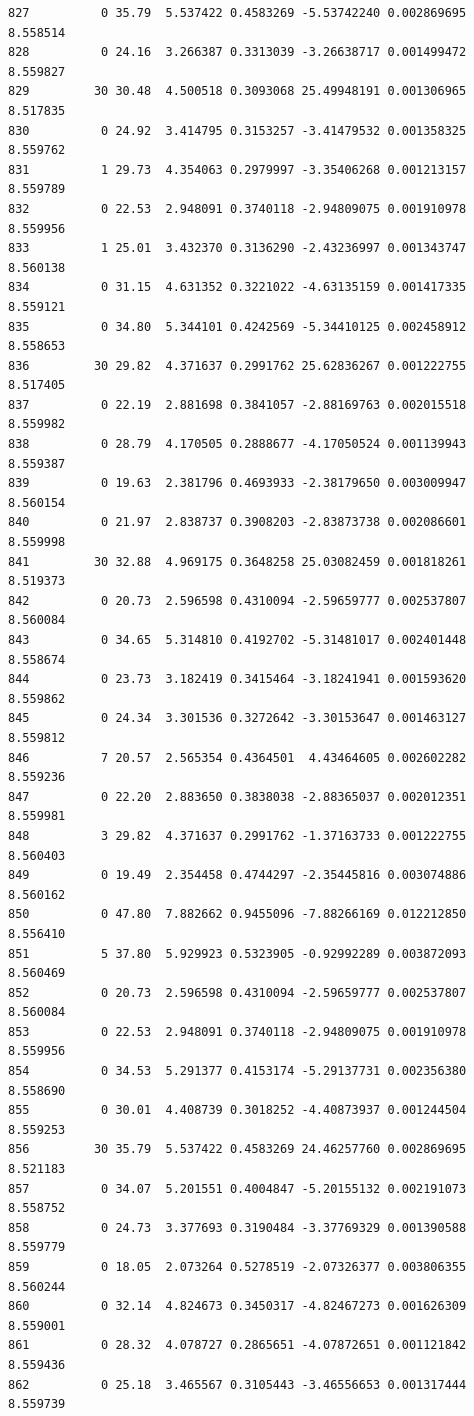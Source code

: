 \documentclass[]{book}
\theoremstyle{definition}
\theoremstyle{definition}
\theoremstyle{definition}
\theoremstyle{remark}
\begin{document}
\begin{verbatim}
827          0 35.79  5.537422 0.4583269 -5.53742240 0.002869695 8.558514
828          0 24.16  3.266387 0.3313039 -3.26638717 0.001499472 8.559827
829         30 30.48  4.500518 0.3093068 25.49948191 0.001306965 8.517835
830          0 24.92  3.414795 0.3153257 -3.41479532 0.001358325 8.559762
831          1 29.73  4.354063 0.2979997 -3.35406268 0.001213157 8.559789
832          0 22.53  2.948091 0.3740118 -2.94809075 0.001910978 8.559956
833          1 25.01  3.432370 0.3136290 -2.43236997 0.001343747 8.560138
834          0 31.15  4.631352 0.3221022 -4.63135159 0.001417335 8.559121
835          0 34.80  5.344101 0.4242569 -5.34410125 0.002458912 8.558653
836         30 29.82  4.371637 0.2991762 25.62836267 0.001222755 8.517405
837          0 22.19  2.881698 0.3841057 -2.88169763 0.002015518 8.559982
838          0 28.79  4.170505 0.2888677 -4.17050524 0.001139943 8.559387
839          0 19.63  2.381796 0.4693933 -2.38179650 0.003009947 8.560154
840          0 21.97  2.838737 0.3908203 -2.83873738 0.002086601 8.559998
841         30 32.88  4.969175 0.3648258 25.03082459 0.001818261 8.519373
842          0 20.73  2.596598 0.4310094 -2.59659777 0.002537807 8.560084
843          0 34.65  5.314810 0.4192702 -5.31481017 0.002401448 8.558674
844          0 23.73  3.182419 0.3415464 -3.18241941 0.001593620 8.559862
845          0 24.34  3.301536 0.3272642 -3.30153647 0.001463127 8.559812
846          7 20.57  2.565354 0.4364501  4.43464605 0.002602282 8.559236
847          0 22.20  2.883650 0.3838038 -2.88365037 0.002012351 8.559981
848          3 29.82  4.371637 0.2991762 -1.37163733 0.001222755 8.560403
849          0 19.49  2.354458 0.4744297 -2.35445816 0.003074886 8.560162
850          0 47.80  7.882662 0.9455096 -7.88266169 0.012212850 8.556410
851          5 37.80  5.929923 0.5323905 -0.92992289 0.003872093 8.560469
852          0 20.73  2.596598 0.4310094 -2.59659777 0.002537807 8.560084
853          0 22.53  2.948091 0.3740118 -2.94809075 0.001910978 8.559956
854          0 34.53  5.291377 0.4153174 -5.29137731 0.002356380 8.558690
855          0 30.01  4.408739 0.3018252 -4.40873937 0.001244504 8.559253
856         30 35.79  5.537422 0.4583269 24.46257760 0.002869695 8.521183
857          0 34.07  5.201551 0.4004847 -5.20155132 0.002191073 8.558752
858          0 24.73  3.377693 0.3190484 -3.37769329 0.001390588 8.559779
859          0 18.05  2.073264 0.5278519 -2.07326377 0.003806355 8.560244
860          0 32.14  4.824673 0.3450317 -4.82467273 0.001626309 8.559001
861          0 28.32  4.078727 0.2865651 -4.07872651 0.001121842 8.559436
862          0 25.18  3.465567 0.3105443 -3.46556653 0.001317444 8.559739

\end{verbatim}
\end{document}
